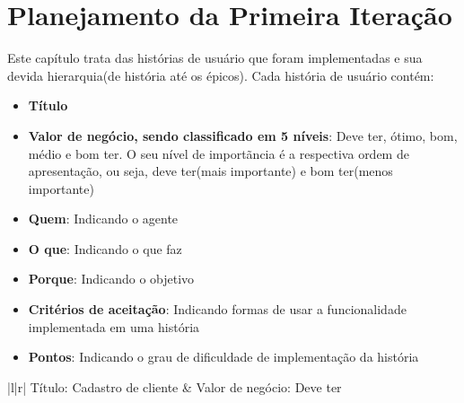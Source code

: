 \chapter{Planejamento da Primeira Iteração}
Este capítulo trata das histórias de usuário que foram implementadas e sua devida hierarquia(de história até os épicos). Cada história de usuário contém:
\begin{itemize}
\item \textbf{Título}
\item \textbf{Valor de negócio, sendo classificado em 5 níveis}: Deve ter, ótimo, bom, médio e bom ter. O seu nível de importãncia é a respectiva ordem de apresentação, ou seja, deve ter(mais importante) e bom ter(menos importante)
\item \textbf{Quem}: Indicando o agente
\item \textbf{O que}: Indicando o que faz
\item \textbf{Porque}: Indicando o objetivo
\item \textbf{Critérios de aceitação}: Indicando formas de usar a funcionalidade implementada em uma história
\item \textbf{Pontos}: Indicando o grau de dificuldade de implementação da história
\end{itemize}

\begin{table}[]
\centering
\label{h01}
\begin{tabular}{|l|r|}
\hline
Título: Cadastro de cliente                                                                          & Valor de negócio: Deve ter                                                                         \\ \hline
{}                                                                                                                                                               \\ \hline
{}                                                                                                            \\ \hline
{}                                                                                                                                \\ \hline
{} \\ \hline
{}                                                                                                                                                                             \\ \hline
\end{tabular}
\caption{História de usuário 01}
\end{table}

